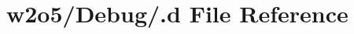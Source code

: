 \hypertarget{w2o5_2_debug_2_8d}{}\section{w2o5/\+Debug/.d File Reference}
\label{w2o5_2_debug_2_8d}
